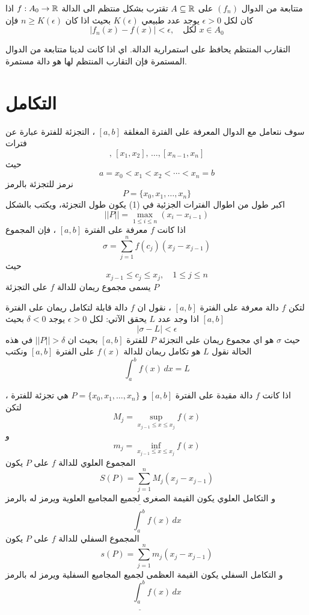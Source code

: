 \begin{definition}
	متتابعة من الدوال $(f_n)$ على $A\subseteq\mathbb{R}$ تقترب بشكل منتظم الى الدالة $f:A_0\to\mathbb{R}$ اذا كان لكل $\epsilon>0$ يوجد عدد طبيعي $K(\epsilon)$ بحيث اذا كان $n\geq K(\epsilon)$ فإن 
	\[
	|f_n(x) - f(x) | < \epsilon, \quad \text{لكل $x\in A_0$}
	\]
\end{definition}

\begin{note}
	التقارب المنتظم يحافظ على استمرارية الدالة. اي اذا كانت لدينا متتابعة من الدوال المستمرة فإن التقارب المنتظم لها هو دالة مستمرة.
\end{note}

\section[التكامل]{التكامل \cite{introrealanal}}

سوف نتعامل مع الدوال المعرفة على الفترة المغلقة $[a, b]$ ، التجزئة للفترة عبارة عن فترات 
\begin{equation}
	[x_0, x_1],\, [x_1, x_2],\, \dots, [x_{n-1}, x_n]
\end{equation}
حيث
\begin{equation}
	a = x_0 < x_1 < x_2 < \cdots < x_n=b
\end{equation}
نرمز للتجزئة بالرمز 
\[
P = \{x_0 , x_1, \dots, x_n\}
\]
اكبر طول من اطوال الفترات الجزئية في (1) يكون طول التجزئة، ويكتب بالشكل
\[
||P|| = \max_{1\leq i \leq n} (x_i - x_{i-1})
\]
اذا كانت $f$ معرفة على الفترة $[a, b]$ ، فإن المجموع
\[
\sigma = \sum_{j=1}^{n} f(c_j) (x_j - x_{j-1})
\]
حيث
\[
x_{j-1} \leq c_j \leq x_j , \quad 1\leq j \leq n
\]
يسمى مجموع ريمان للدالة $f$ على التجزئة $P$

\begin{definition}
	لتكن $f$ دالة معرفة على الفترة $[a, b]$ ، نقول ان $f$ دالة قابلة لتكامل ريمان على الفترة $[a, b]$ اذا وجد عدد $L$ يحقق الآتي: لكل $\epsilon> 0 $ يوجد $\delta < 0 $ بحيث
	\[
	|\sigma - L |< \epsilon
	\]
	حيث $\sigma$ هو اي مجموع ريمان على التجزئة $P$ للفترة $[a, b]$ بحيث ان $||P|| > \delta$ في هذه الحالة نقول $L$ هو تكامل ريمان للدالة $f(x)$ على الفترة $[a, b]$ ونكتب
	\[
	\int_{a}^{b} f(x)\, dx = L
	\]
\end{definition}

\begin{definition}
	اذا كانت $f$ دالة مقيدة على الفترة $[a, b]$ و $P = \{x_0, x_1, \dots, x_n\}$ هي تجزئة للفترة ، لتكن 
	\[
	M_j = \sup_{x_{j-1}\leq x\leq x_j} f(x)
	\]
	و
	\[
	m_j = \inf_{x_{j-1}\leq x\leq x_j} f(x)
	\]
	المجموع العلوي للدالة $f$ على $P$ يكون
	\[
	S(P) = \sum_{j=1}^{n} M_j (x_j - x_{j-1})
	\]
	و التكامل العلوي يكون القيمة الصغرى لجميع المجاميع العلوية ويرمز له بالرمز
	\[
	\overline{
	\int_{a}^{b} 
	}
	f(x)\, dx
	\]
	المجموع السفلي للدالة $f$ على $P$ يكون
	\[
	s(P) = \sum_{j=1}^{n} m_j (x_j - x_{j-1})
	\]
	و التكامل السفلي يكون القيمة العظمى لجميع المجاميع السفلية ويرمز له بالرمز
	\[
	\underline{
		\int_{a}^{b} 
	}
	f(x)\, dx
	\]
\end{definition}

